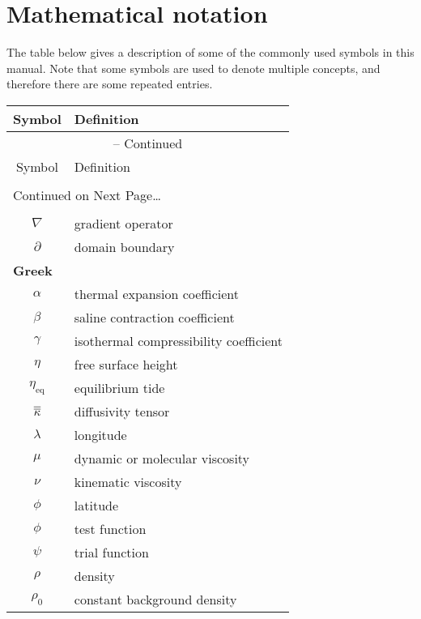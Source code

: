 \chapter{Mathematical notation}

The table below gives a description of some of the commonly used symbols in this manual.
Note that some symbols are used to denote multiple concepts, and therefore there are some repeated
entries.

\begin{center}
\begin{longtable}{cl}
\hline\hline
Symbol & Definition\\
\hline\hline
\endfirsthead
%
\multicolumn{2}{c}{{\tablename} -- Continued} \\[0.5ex]
\hline\hline
Symbol & Definition\\
\hline\hline
\endhead
  \\[0.5ex]
  \multicolumn{2}{l}{{Continued on Next Page\ldots}} \\
\endfoot
  \hline
\endlastfoot
%
%
\multicolumn{2}{l}{{\bf Mathematical symbols}} \\ \hline
%
$\nabla$     & gradient operator \\
$\partial$   & domain boundary \\
\hline
%
\multicolumn{2}{l}{{\bf Greek}} \\ \hline
%
$\alpha$     & thermal expansion coefficient\\
$\beta$      & saline contraction coefficient\\
$\gamma$     & isothermal compressibility coefficient\\
$\eta$       & free surface height\\
$\eta_{\textrm{eq}}$ & equilibrium tide\\
$\overline{\overline{\kappa}}$   & diffusivity tensor\\
$\lambda$    & longitude\\
$\mu$        & dynamic or molecular viscosity\\
$\nu$        & kinematic viscosity\\
$\phi$       & latitude\\
$\phi$       & test function\\
$\psi$       & trial function\\
$\rho$       & density\\
$\rho_0$     & constant background density\\

\end{longtable}
\end{center}
